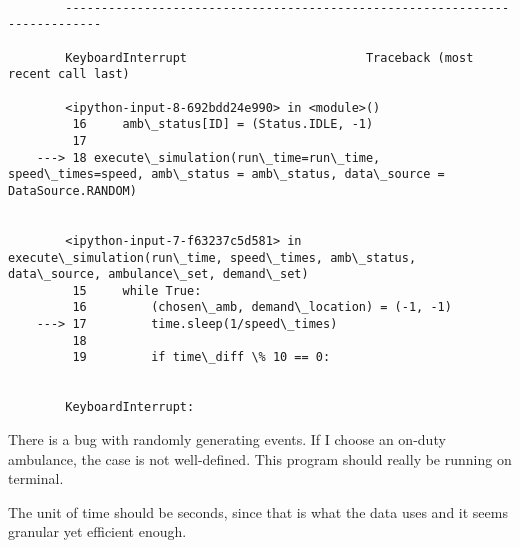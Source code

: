 \documentclass[11pt]{article}
\begin{document}
    \begin{Verbatim}[commandchars=\\\{\}]

        ---------------------------------------------------------------------------

        KeyboardInterrupt                         Traceback (most recent call last)

        <ipython-input-8-692bdd24e990> in <module>()
         16     amb\_status[ID] = (Status.IDLE, -1)
         17 
    ---> 18 execute\_simulation(run\_time=run\_time, speed\_times=speed, amb\_status = amb\_status, data\_source = DataSource.RANDOM)
    

        <ipython-input-7-f63237c5d581> in execute\_simulation(run\_time, speed\_times, amb\_status, data\_source, ambulance\_set, demand\_set)
         15     while True:
         16         (chosen\_amb, demand\_location) = (-1, -1)
    ---> 17         time.sleep(1/speed\_times)
         18 
         19         if time\_diff \% 10 == 0:


        KeyboardInterrupt: 

    \end{Verbatim}

    There is a bug with randomly generating events. If I choose an on-duty
ambulance, the case is not well-defined. This program should really be
running on terminal.

The unit of time should be seconds, since that is what the data uses and
it seems granular yet efficient enough.


    
    
    
    
\end{document}
